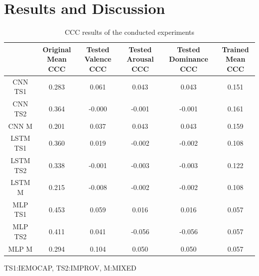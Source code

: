 \documentclass[a4paper,11pt]{article}
\begin{document}
\section{Results and Discussion} \label{sec:results}
\begin{table}[h]
    \centering
    \begin{tabular}{cccccc}
        \toprule
        {} &  \makecell{Original \\ Mean CCC} &  \makecell{Tested \\Valence CCC} &  \makecell{Tested \\Arousal CCC} &  \makecell{Tested\\ Dominance CCC} &  \makecell{Trained \\ Mean CCC} \\
        \midrule
        CNN TS1  &              0.283 &               0.061 &               0.043 &                 0.043 &             0.151 \\
        CNN TS2   &              0.364 &              -0.000 &              -0.001 &                -0.001 &             0.161 \\
        CNN M    &              0.201 &               0.037 &               0.043 &                 0.043 &             0.159 \\
        LSTM TS1 &              0.360 &               0.019 &              -0.002 &                -0.002 &             0.108 \\
        LSTM TS2  &              0.338 &              -0.001 &              -0.003 &                -0.003 &             0.122 \\
        LSTM M   &              0.215 &              -0.008 &              -0.002 &                -0.002 &             0.108 \\
        MLP TS1  &              0.453 &               0.059 &               0.016 &                 0.016 &             0.057 \\
        MLP TS2   &              0.411 &               0.041 &              -0.056 &                -0.056 &             0.057 \\
        MLP M    &              0.294 &               0.104 &               0.050 &                 0.050 &             0.057 \\
        \bottomrule
        \end{tabular}
        
    \captionsetup{justification=centering, singlelinecheck=off} 
    \caption{CCC results of the conducted experiments }
    \vspace*{5pt} TS1:IEMOCAP, TS2:IMPROV, M:MIXED
    \label{tab:CCCloss}
\end{table}
\end{document}
